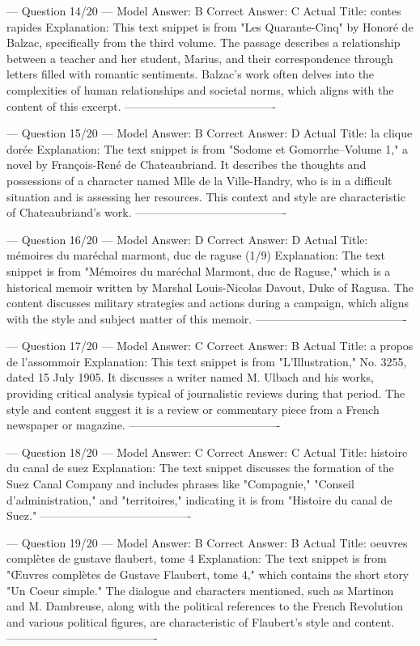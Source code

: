 \documentclass[11pt]{article}
\begin{document}
{--- Question 14/20 ---
Model Answer:    B
Correct Answer:  C
Actual Title:    contes rapides
Explanation:     This text snippet is from "Les Quarante-Cinq" by Honoré de Balzac, specifically from the third volume. The passage describes a relationship between a teacher and her student, Marius, and their correspondence through letters filled with romantic sentiments. Balzac's work often delves into the complexities of human relationships and societal norms, which aligns with the content of this excerpt.
----------------------------------------

--- Question 15/20 ---
Model Answer:    B
Correct Answer:  D
Actual Title:    la clique dorée
Explanation:     The text snippet is from "Sodome et Gomorrhe--Volume 1," a novel by François-René de Chateaubriand. It describes the thoughts and possessions of a character named Mlle de la Ville-Handry, who is in a difficult situation and is assessing her resources. This context and style are characteristic of Chateaubriand's work.
----------------------------------------

--- Question 16/20 ---
Model Answer:    D
Correct Answer:  D
Actual Title:    mémoires du maréchal marmont, duc de raguse (1/9)
Explanation:     The text snippet is from "Mémoires du maréchal Marmont, duc de Raguse," which is a historical memoir written by Marshal Louis-Nicolas Davout, Duke of Ragusa. The content discusses military strategies and actions during a campaign, which aligns with the style and subject matter of this memoir.
----------------------------------------

--- Question 17/20 ---
Model Answer:    C
Correct Answer:  B
Actual Title:    a propos de l'assommoir
Explanation:     This text snippet is from "L'Illustration," No. 3255, dated 15 July 1905. It discusses a writer named M. Ulbach and his works, providing critical analysis typical of journalistic reviews during that period. The style and content suggest it is a review or commentary piece from a French newspaper or magazine.
----------------------------------------

--- Question 18/20 ---
Model Answer:    C
Correct Answer:  C
Actual Title:    histoire du canal de suez
Explanation:     The text snippet discusses the formation of the Suez Canal Company and includes phrases like "Compagnie," "Conseil d’administration," and "territoires," indicating it is from "Histoire du canal de Suez."
----------------------------------------

--- Question 19/20 ---
Model Answer:    B
Correct Answer:  B
Actual Title:    oeuvres complètes de gustave flaubert, tome 4
Explanation:     The text snippet is from "Œuvres complètes de Gustave Flaubert, tome 4," which contains the short story "Un Coeur simple." The dialogue and characters mentioned, such as Martinon and M. Dambreuse, along with the political references to the French Revolution and various political figures, are characteristic of Flaubert's style and content.
----------------------------------------

}
\end{document}
